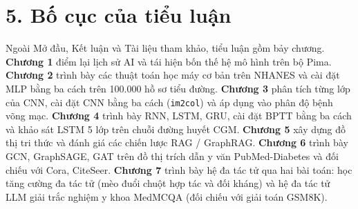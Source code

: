 
\section*{5. Bố cục của tiểu luận}

Ngoài Mở đầu, Kết luận và Tài liệu tham khảo, tiểu luận gồm bảy chương. \textbf{Chương 1} điểm lại lịch sử AI và tái hiện bốn thế hệ mô hình trên bộ Pima. \textbf{Chương 2} trình bày các thuật toán học máy cơ bản trên NHANES và cài đặt MLP bằng ba cách trên 100.000 hồ sơ tiểu đường. \textbf{Chương 3} phân tích từng lớp của CNN, cài đặt CNN bằng ba cách (\texttt{im2col}) và áp dụng vào phân độ bệnh võng mạc. \textbf{Chương 4} trình bày RNN, LSTM, GRU, cài đặt BPTT bằng ba cách và khảo sát LSTM 5 lớp trên chuỗi đường huyết CGM. \textbf{Chương 5} xây dựng đồ thị tri thức và đánh giá các chiến lược RAG / GraphRAG. \textbf{Chương 6} trình bày GCN, GraphSAGE, GAT trên đồ thị trích dẫn y văn PubMed-Diabetes và đối chiếu với Cora, CiteSeer. \textbf{Chương 7} trình bày hệ đa tác tử qua hai bài toán: học tăng cường đa tác tử (mèo đuổi chuột hợp tác và đối kháng) và hệ đa tác tử LLM giải trắc nghiệm y khoa MedMCQA (đối chiếu với giải toán GSM8K).
